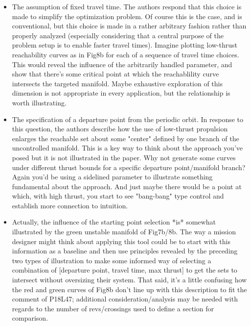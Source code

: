 \documentclass[11pt]{article}
\begin{document}
\begin{itemize}
    \item 
        \begin{itshape}
            The assumption of fixed travel time.  The authors respond that this choice is made to simplify the optimization problem.  Of course this is the case, and is conventional, but this choice is made in a rather arbitrary fashion rather than properly analyzed (especially considering that a central purpose of the problem setup is to enable faster travel times).  Imagine plotting low-thrust reachability curves as in Fig8b for each of a sequence of travel time choices.  This would reveal the influence of the arbitrarily handled parameter, and show that there's some critical point at which the reachablility curve intersects the targeted manifold.  Maybe exhaustive exploration of this dimension is not appropriate in every application, but the relationship is worth illustrating.
        \end{itshape}

    \item 
        \begin{itshape}
            The specification of a departure point from the periodic orbit.  In response to this question, the authors describe how the use of low-thrust propulsion enlarges the reachable set about some "center" defined by one branch of the uncontrolled manifold.  This is a key way to think about the approach you've posed but it is not illustrated in the paper.  Why not generate some curves under different thrust bounds for a specific departure point/manifold branch?  Again you'd be using a sidelined parameter to illustrate something fundamental about the approach.  And just maybe there would be a point at which, with high thrust, you start to see "bang-bang" type control and establish more connection to intuition.  
        \end{itshape}

    \item 
        \begin{itshape}
            Actually, the influence of the starting point selection *is* somewhat illustrated by the green unstable manifold of Fig7b/8b.  The way a mission designer might think about applying this tool could be to start with this information as a baseline and then use principles revealed by the preceding two types of illustration to make some informed way of selecting a combination of [departure point, travel time, max thrust] to get the sets to intersect without oversizing their system.  That said, it's a little confusing how the red and green curves of Fig8b don't line up with this description to fit the comment of P18L47; additional consideration/analysis may be needed with regards to the number of revs/crossings used to define a section for comparison.
        \end{itshape}


\end{itemize}
\end{document}
